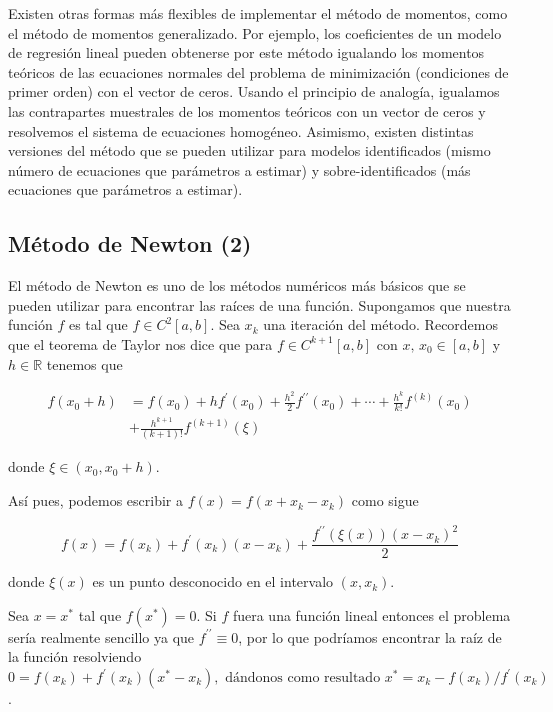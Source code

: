 \documentclass[9pt,twocolumn,twoside,]{pnas-new}
\begin{document}
Existen otras formas más flexibles de implementar el método de momentos,
como el método de momentos generalizado. Por ejemplo, los coeficientes
de un modelo de regresión lineal pueden obtenerse por este método
igualando los momentos teóricos de las ecuaciones normales del problema
de minimización (condiciones de primer orden) con el vector de ceros.
Usando el principio de analogía, igualamos las contrapartes muestrales
de los momentos teóricos con un vector de ceros y resolvemos el sistema
de ecuaciones homogéneo. Asimismo, existen distintas versiones del
método que se pueden utilizar para modelos identificados (mismo número
de ecuaciones que parámetros a estimar) y sobre-identificados (más
ecuaciones que parámetros a estimar).

\hypertarget{muxe9todo-de-newton-ascher2011first}{%
\subsection{Método de Newton
(2)}\label{muxe9todo-de-newton-ascher2011first}}

El método de Newton es uno de los métodos numéricos más básicos que se
pueden utilizar para encontrar las raíces de una función. Supongamos que
nuestra función \(f\) es tal que \(f \in C^2[a,b]\). Sea \(x_k\) una
iteración del método. Recordemos que el teorema de Taylor nos dice que
para \(f \in C^{k+1}[a,b]\) con \(x, \, x_0 \in [a,b]\) y
\(h\in\mathbb{R}\) tenemos que

\begin{equation*}
    \begin{aligned}
        f\left(x_{0}+h\right) &=f\left(x_{0}\right)+h f^{\prime}\left(x_{0}\right)+\frac{h^{2}}{2} f^{\prime \prime}\left(x_{0}\right)+\cdots+\frac{h^{k}}{k !} f^{(k)}\left(x_{0}\right) \\
        &+\frac{h^{k+1}}{(k+1) !} f^{(k+1)}(\xi)
    \end{aligned}
\end{equation*}

donde \(\xi \in(x_0,x_0+h)\).

Así pues, podemos escribir a \(f(x)=f(x+x_k-x_k)\) como sigue

\[
    f(x)=f\left(x_{k}\right)+f^{\prime}\left(x_{k}\right)\left(x-x_{k}\right)+\frac{f^{\prime \prime}(\xi(x))\left(x-x_{k}\right)^{2}}{2} 
\]

donde \(\xi(x)\) es un punto desconocido en el intervalo \((x,x_k)\).

Sea \(x=x^*\) tal que \(f(x^*)=0\). Si \(f\) fuera una función lineal
entonces el problema sería realmente sencillo ya que
\(f^{\prime\prime}\equiv0\), por lo que podríamos encontrar la raíz de
la función resolviendo
\(0=f\left(x_{k}\right)+f^{\prime}\left(x_{k}\right)\left(x^{*}-x_{k}\right), \text { dándonos como resultado } x^{*}=x_{k}-f\left(x_{k}\right) / f^{\prime}\left(x_{k}\right)\).
\end{document}

